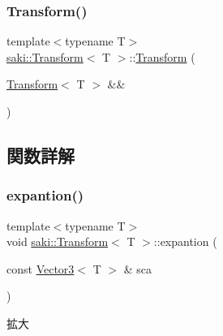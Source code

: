 \mbox{\label{classsaki_1_1_transform_a065323d290c8c4edd76855e7b9634ab8}} 
\subsubsection{\texorpdfstring{Transform()}{Transform()}\hspace{0.1cm}{\footnotesize\ttfamily [4/4]}}
{\footnotesize\ttfamily template$<$typename T$>$ \\
\mbox{\hyperlink{classsaki_1_1_transform}{saki\+::\+Transform}}$<$ T $>$\+::\mbox{\hyperlink{classsaki_1_1_transform}{Transform}} (\begin{DoxyParamCaption}\item[{\mbox{\hyperlink{classsaki_1_1_transform}{Transform}}$<$ T $>$ \&\&}]{ }\end{DoxyParamCaption})\hspace{0.3cm}{\ttfamily [default]}}



\subsection{関数詳解}
\mbox{\label{classsaki_1_1_transform_a58885f17529b9c32308ec826d67a82fd}} 
\subsubsection{\texorpdfstring{expantion()}{expantion()}}
{\footnotesize\ttfamily template$<$typename T$>$ \\
void \mbox{\hyperlink{classsaki_1_1_transform}{saki\+::\+Transform}}$<$ T $>$\+::expantion (\begin{DoxyParamCaption}\item[{const \mbox{\hyperlink{classsaki_1_1_vector3}{Vector3}}$<$ T $>$ \&}]{sca }\end{DoxyParamCaption})\hspace{0.3cm}{\ttfamily [inline]}}



拡大 

\mbox{\label{classsaki_1_1_transform_a781a14da529aa0a45d4cfb66768ffc8c}} 
